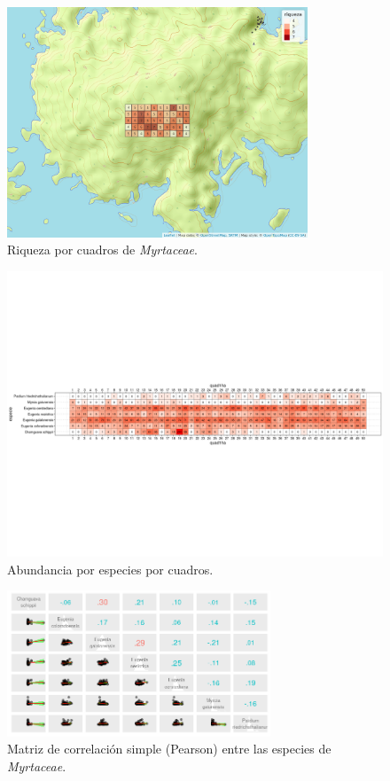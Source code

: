\documentclass[11pt,]{article}
\begin{document}
\begin{figure}
\centering
\includegraphics[width=0.80000\textwidth]{mapa_cuadros_riq_mi_familia.png}
\caption{Riqueza por cuadros de \emph{Myrtaceae}.\label{fig:riqmifam}}
\end{figure}

\begin{figure}
\centering
\includegraphics[width=1.00000\textwidth]{abuespecua.png}
\caption{Abundancia por especies por cuadros.\label{fig:abuxcua}}
\end{figure}

\begin{figure}
\centering
\includegraphics[width=0.70000\textwidth]{correlacion de pearson entre especies.png}
\caption{Matriz de correlación simple (Pearson) entre las especies de
\emph{Myrtaceae}.\label{fig:corresp}}
\end{figure}
\end{document}
